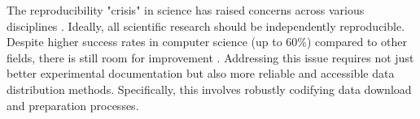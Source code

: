 \documentclass[10pt,twocolumn,letterpaper]{article}
\begin{document}






The reproducibility "crisis" in science has raised concerns across various disciplines
  \cite{baker_reproducibility_2016}.
Ideally, all scientific research should be independently reproducible.
Despite higher success rates in computer science (up to 60\%) compared to other fields, there is still room for improvement
\cite{NEURIPS2019_c429429b, collberg2016repeatability, desai_what_2024}.
Addressing this issue requires not just better experimental documentation but also more reliable and
  accessible data distribution methods.
Specifically, this involves robustly codifying data download and preparation processes.
\end{document}
